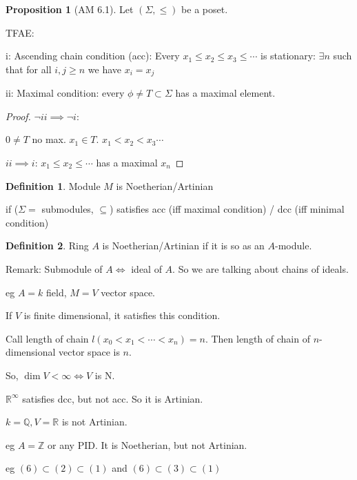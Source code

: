 \documentclass{article}
\theoremstyle{definition}
\newtheorem{definition}{Definition}
\newtheorem{proposition}{Proposition}
\begin{document}
\begin{proposition}
    [AM 6.1]

    Let \((\Sigma , \leq )\) be a poset.

    TFAE:

    i: Ascending chain condition (acc): Every \(x_1 \leq x_2 \leq x_3 \leq \cdots\) is stationary: \(\exists n\) such that for all \(i,j\geq n\) we have \(x_i = x_j\)  

    ii: Maximal condition: every \(\phi \neq T \subset \Sigma\) has a maximal element.  
\end{proposition}

\begin{proof}
    \(\lnot ii \implies \lnot i\):
    
    \(0\neq T\) no max. \(x_1\in T\). \(x_1 < x_2 < x_3 \cdots\) 
    
    \(ii \implies i\): \(x_1 \leq x_2\leq \cdots\) has a maximal \(x_n\) 
\end{proof}

\begin{definition}
    Module \(M\) is Noetherian/Artinian

    if (\(\Sigma = \) submodules, \(\subseteq\)) satisfies acc (iff maximal condition) / dcc (iff minimal condition)
\end{definition}

\begin{definition}
    Ring \(A\) is Noetherian/Artinian if it is so as an \(A\)-module.
\end{definition}

Remark: Submodule of \(A \iff\) ideal of \(A\). So we are talking about chains of ideals.

eg \(A = k\) field, \(M = V\) vector space.

If \(V\) is finite dimensional, it satisfies this condition.

Call length of chain \(l(x_0 < x_1 < \cdots < x_n) = n\). Then length of chain of \(n\)-dimensional vector space is \(n\).

So, \(\dim V < \infty \iff V\) is N.

\(\mathbb{R}^{\infty}\) satisfies dcc,  but not acc. So it is Artinian.

\(k=\mathbb{Q} , V = \mathbb{R}\) is not Artinian.

eg \(A = \mathbb{Z}\) or any PID. It is Noetherian, but not Artinian.

eg \((6) \subset (2) \subset (1)\) and \((6) \subset (3) \subset (1)\)
\end{document}
